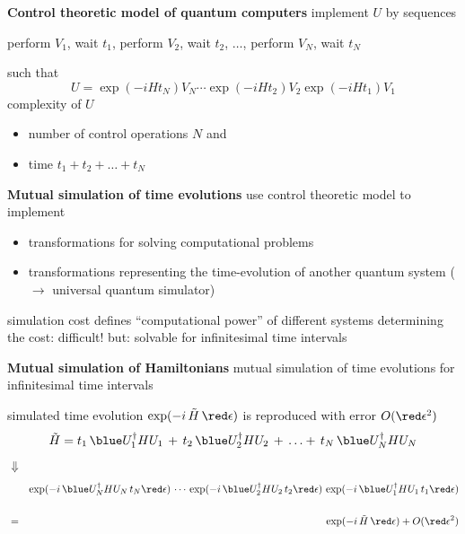 \documentclass[portrait]{seminar}
\begin{document}
\begin{slide}
{\large {\bf Control theoretic model of quantum computers}}
\vfill
implement $U$ by sequences

perform $V_1$, wait $t_1$, perform $V_2$, wait $t_2$, $\ldots$, 
perform $V_N$, wait $t_N$

such that
\[
U=\exp(-i H t_N) V_N \cdots \exp(-i H t_2) V_2 \exp(-i H t_1) V_1
\]
\vfill
{\red complexity of $U$}
\begin{itemize}
\item number of control operations $N$ and
\item time $t_1+t_2+\ldots+t_N$
\end{itemize}
\vfill
\end{slide}




\begin{slide}
{\large {\bf Mutual simulation of time evolutions}} 
\vfill 
use control theoretic model to implement
\begin{itemize}
\item transformations for solving computational problems
\item {\red transformations representing the time-evolution of another 
quantum system} ($\rightarrow$ universal quantum simulator)
\end{itemize}
\vfill 
simulation cost defines ``computational power'' of
different systems 
\vfill 
determining the cost: difficult!  
\vfill 
but: solvable for {\blue infinitesimal} time intervals
\vfill
\end{slide}

\begin{slide}
{\large {\bf Mutual simulation of {\red Hamiltonians}}} 
\vfill 
mutual simulation of time evolutions for {\red infinitesimal} time
intervals
\medskip

simulated time evolution $\exp(-i\, \tilde{H}\,{\red \epsilon})$ is
reproduced with error $O({\red \epsilon^2})$ 
\vfill
\[
\tilde{H} =
t_1\, {\blue U_1^\dagger H U_1}\, +\, 
t_2\, {\blue U_2^\dagger H U_2}\, +\, 
\ldots +\,
t_N\, {\blue U_N^\dagger H U_N} 
\]
\hspace{5cm}
{\LARGE $\Downarrow$}
\begin{eqnarray*}
&& 
\exp(-i\, {\blue U_N^\dagger H U_N}\, t_N{\red \epsilon})\, \cdots\, 
\exp(-i\, {\blue U_2^\dagger H U_2}\, t_2{\red \epsilon})\,
\exp(-i\, {\blue U_1^\dagger H U_1}\, t_1{\red \epsilon})  \\
& & \\
& = & 
\exp(-i\, \tilde{H}\,{\red \epsilon}) +O({\red \epsilon^2})
\end{eqnarray*}
\vfill
\end{slide}
\end{document}
